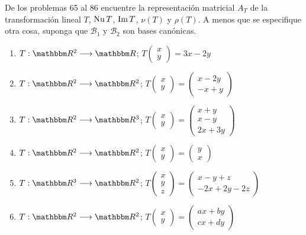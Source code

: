 De los problemas 65 al 86 encuentre la representación matricial $A_{T}$ de la transformación lineal $T$, $\operatorname{Nu} T$, $\operatorname{Im} T$, $\nu(T)$ y $\rho(T)$. A menos que se especifique otra cosa, suponga que $\mathcal{B}_1$ y $\mathcal{B}_2$ son bases canónicas.
\begin{enumerate}[resume]
    \item $T: \RR[2] \longrightarrow \RR$; $T\begin{pmatrix*}x \\ y\end{pmatrix*}=3 x-2 y$
    \item $T: \RR[2] \longrightarrow \RR[2]$; $T\begin{pmatrix*}x \\ y\end{pmatrix*}=\begin{pmatrix*}x-2 y \\ -x+y\end{pmatrix*}$
    \item $T: \RR[2] \longrightarrow \RR[3]$; $T\begin{pmatrix*}x \\ y\end{pmatrix*}=\begin{pmatrix*}x+y \\ x-y \\ 2 x+3 y\end{pmatrix*}$\newpage
    \item $T: \RR[2] \longrightarrow \RR[2]$; $T\begin{pmatrix*}x \\ y\end{pmatrix*}=\begin{pmatrix*}y \\ x\end{pmatrix*}$
    \item $T: \RR[3] \longrightarrow \RR[2]$; $T\begin{pmatrix*}x \\ y \\ z\end{pmatrix*}=\begin{pmatrix*}x-y+z \\ -2 x+2 y-2 z\end{pmatrix*}$
    \item $T: \RR[2] \longrightarrow \RR[2]$; $T\begin{pmatrix*}x \\ y\end{pmatrix*}=\begin{pmatrix*}a x+b y \\ c x+d y\end{pmatrix*}$

\end{enumerate}
